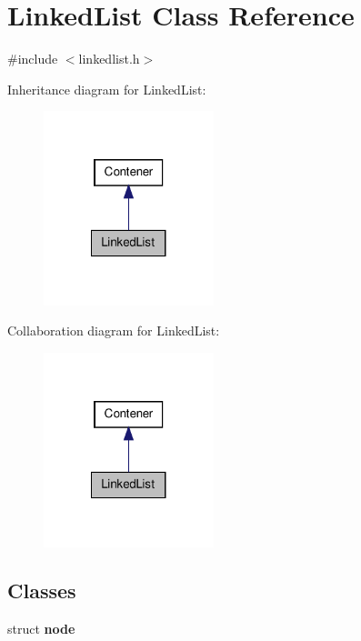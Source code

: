 \hypertarget{class_linked_list}{\section{\-Linked\-List \-Class \-Reference}
\label{class_linked_list}
}


{\ttfamily \#include $<$linkedlist.\-h$>$}



\-Inheritance diagram for \-Linked\-List\-:
\nopagebreak
\begin{figure}[H]
\begin{center}
\leavevmode
\includegraphics[width=140pt]{class_linked_list__inherit__graph}
\end{center}
\end{figure}


\-Collaboration diagram for \-Linked\-List\-:
\nopagebreak
\begin{figure}[H]
\begin{center}
\leavevmode
\includegraphics[width=140pt]{class_linked_list__coll__graph}
\end{center}
\end{figure}
\subsection*{\-Classes}
\begin{DoxyCompactItemize}
\item 
struct {\bfseries node}
\end{DoxyCompactItemize}
